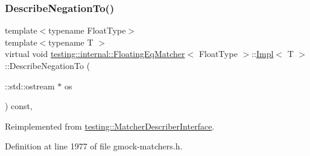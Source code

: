 \subsubsection{\texorpdfstring{Describe\+Negation\+To()}{DescribeNegationTo()}}
{\footnotesize\ttfamily template$<$typename Float\+Type$>$ \\
template$<$typename T $>$ \\
virtual void \hyperlink{classtesting_1_1internal_1_1FloatingEqMatcher}{testing\+::internal\+::\+Floating\+Eq\+Matcher}$<$ Float\+Type $>$\+::\hyperlink{classtesting_1_1internal_1_1FloatingEqMatcher_1_1Impl}{Impl}$<$ T $>$\+::Describe\+Negation\+To (\begin{DoxyParamCaption}\item[{\+::std\+::ostream $\ast$}]{os }\end{DoxyParamCaption}) const\hspace{0.3cm}{\ttfamily [inline]}, {\ttfamily [virtual]}}



Reimplemented from \hyperlink{classtesting_1_1MatcherDescriberInterface_a2071afbc47097c4d1c0064275af34db0}{testing\+::\+Matcher\+Describer\+Interface}.



Definition at line 1977 of file gmock-\/matchers.\+h.


